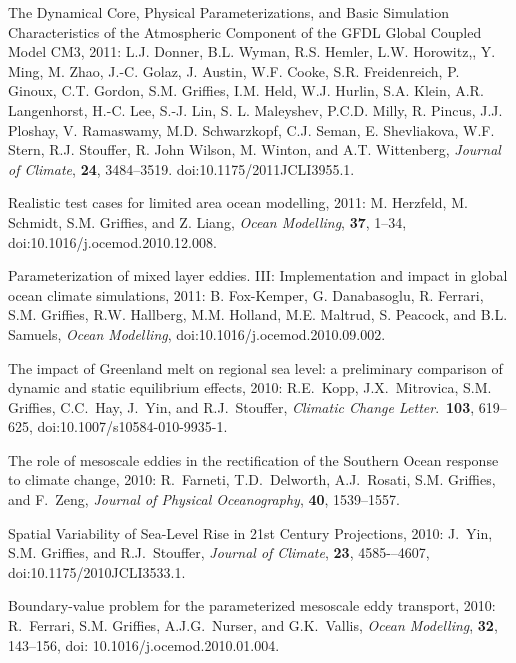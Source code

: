 \begin{etaremune}
\item The Dynamical Core, Physical Parameterizations, and Basic Simulation Characteristics of the Atmospheric Component of the GFDL Global Coupled Model CM3, 2011: L.J. Donner, B.L. Wyman, R.S. Hemler, L.W. Horowitz,, Y. Ming, M. Zhao, J.-C. Golaz, J. Austin, W.F. Cooke, S.R. Freidenreich, P. Ginoux, C.T. Gordon, S.M. Grif\/f\/ies, I.M. Held, W.J. Hurlin, S.A. Klein, A.R. Langenhorst, H.-C. Lee, S.-J. Lin, S. L. Maleyshev, P.C.D. Milly, R. Pincus, J.J. Ploshay, V. Ramaswamy, M.D. Schwarzkopf, C.J. Seman, E. Shevliakova, W.F. Stern, R.J. Stouﬀer, R. John Wilson, M.  Winton, and A.T. Wittenberg, {\it Journal of Climate}, {\bf 24}, 3484--3519. 
  doi:10.1175/2011JCLI3955.1.

\item Realistic test cases for limited area ocean modelling, 2011: M. Herzfeld, M. Schmidt, S.M. Grif\/f\/ies, and Z. Liang, {\it    Ocean Modelling}, {\bf 37}, 1--34, doi:10.1016/j.ocemod.2010.12.008.

\item Parameterization of mixed layer eddies. III: Implementation and impact in global ocean climate simulations, 2011: B. Fox-Kemper,
  G. Danabasoglu, R. Ferrari, S.M. Grif\/f\/ies, R.W. Hallberg, M.M. Holland, M.E. Maltrud, S. Peacock, and B.L. Samuels, {\it Ocean Modelling}, doi:10.1016/j.ocemod.2010.09.002.

\item The impact of Greenland melt on regional sea level: a preliminary comparison of dynamic and static equilibrium effects, 2010: R.E.\ Kopp, J.X.\ Mitrovica, S.M. Grif\/f\/ies, C.C.\  Hay, J.\ Yin, and R.J.\ Stouffer, {\it Climatic Change Letter}.\,
  {\bf 103}, 619--625, doi:10.1007/s10584-010-9935-1.

\item The role of mesoscale eddies in the rectification of the Southern Ocean response to climate change, 2010: R.\ Farneti, T.D.\
  Delworth, A.J.\ Rosati, S.M. Grif\/f\/ies, and F.\ Zeng, {\it Journal of Physical Oceanography}, {\bf 40}, 1539--1557.

\item Spatial Variability of Sea-Level Rise in 21st Century Projections, 2010: J.\ Yin, S.M. Grif\/f\/ies, and R.J.\ Stouffer, {\it Journal of Climate}, {\bf 23}, 4585-–4607,
doi:10.1175/2010JCLI3533.1.

\item Boundary-value problem for the parameterized mesoscale eddy transport, 2010: R.\ Ferrari, S.M. Grif\/f\/ies, A.J.G.\
  Nurser, and G.K.\ Vallis, {\em Ocean Modelling}, {\bf 32}, 143--156, doi: 10.1016/j.ocemod.2010.01.004.


\end{etaremune}

